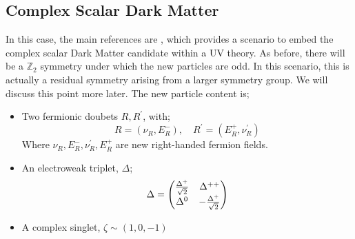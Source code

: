 \documentclass[10pt]{article}
\begin{document}
\subsection{Complex Scalar Dark Matter}
In this case, the main references are \cite{Farzan2010a, Farzan2011}, which provides a scenario to embed the complex scalar Dark Matter candidate within a UV theory. As before, there will be a $\mathbb{Z}_2$ symmetry under which the new particles are odd. In this scenario, this is actually a residual symmetry arising from a larger symmetry group. We will discuss this point more later. The new particle content is;
\begin{itemize}
  \item Two fermionic doubets $R, R^\prime$, with;
  \begin{equation}
    R = (\nu_R, E^-_R), \quad R^\prime = (E^+_R, \nu^\prime_R)
  \end{equation}
  Where $\nu_R, E^-_R, \nu^\prime_R, E^+_R$ are new right-handed fermion fields.
  \item An electroweak triplet, $\Delta$;
  \begin{equation}
    \Delta = \begin{pmatrix}\frac{\Delta^+}{\sqrt{2}}&\Delta^{++} \\ \Delta^0&-\frac{\Delta^+}{\sqrt{2}} \end{pmatrix}
  \end{equation}
  \item A complex singlet, $\zeta \sim (1, 0, -1)$
\end{itemize}
\end{document}
